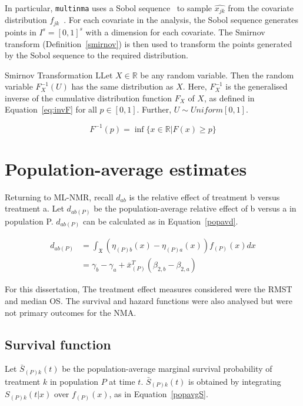In particular, \verb|multinma| uses a Sobol sequence~\cite{sobol} to sample $\hat{x_{jk}}$ from the covariate distribution $f_{jk}$~\cite{phillippo2020}. For each covariate in the analysis, the Sobol sequence generates points in $I^s = [0,1]^s$ with a dimension for each covariate. The Smirnov transform (Definition~\ref{smirnov}) is then used to transform the points generated by the Sobol sequence to the required distribution. 

\begin{definition}[label=smirnov]{Smirnov Transformation}
    LLet $X \in \mathbb{R}$ be any random variable. Then the random variable $F_X^{-1}(U)$ has the same distribution as $X$. Here, $F_X^{-1}$ is the generalised inverse of the cumulative distribution function $F_X$ of $X$, as defined in Equation~\ref{eq:invF} for all $p \in [0,1]$. Further, $U \sim Uniform[0,1]$.

    \begin{equation}
        F^{-1}(p) = \inf \{x \in \mathbb{R} | F(x) \geq p \}
        \label{eq:invF}
    \end{equation}
\end{definition}

\section{Population-average estimates}
Returning to ML-NMR, recall $d_{ab}$ is the relative effect of treatment b versus treatment a. Let $d_{ab(P)}$ be the population-average relative effect of b versus a in population P. $d_{ab(P)}$ can be calculated as in Equation~\ref{popavd}. 

\begin{align}
    d_{ab(P)} &= \int_{\mathfrak{X}}(\eta_{(P)b}(x) - \eta_{(P)a}(x))f_{(P)}(x)dx \label{popavgdInt} \\
              &= \gamma_b - \gamma_a + \bar{x}^T_{(P)}(\beta_{2,b}-\beta_{2,a}) \label{popavd}
\end{align}

For this dissertation, The treatment effect measures considered were the RMST and median OS. The survival and hazard functions were also analysed but were not primary outcomes for the NMA.

\subsection{Survival function}
Let $\bar{S}_{(P)k}(t)$ be the population-average marginal survival probability of treatment $k$ in population $P$ at time $t$. $\bar{S}_{(P)k}(t)$ is obtained by integrating $S_{(P)k}(t|x)$ over $f_{(P)}(x)$, as in Equation~\ref{popavgS}.

